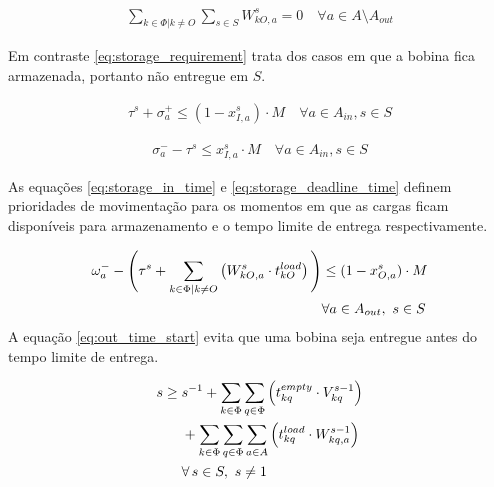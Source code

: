 \documentclass[journal]{IEEEtran}
\begin{document}
        \begin{align}
            \sum_{k \in \Phi | k \neq O} \sum_{s \in S} W^s_{kO,a} = 0 \quad \forall a \in A \setminus A_{out} 
            \label{eq:storage_requirement}
        \end{align}

        Em contraste \ref{eq:storage_requirement} trata dos casos em que a bobina fica armazenada, portanto não
        entregue em $S$.
        
        

        \begin{align}
        \tau^s + \sigma^+_a \leq (1 - x^s_{I,a}) \cdot M \quad \forall a \in A_{in}, s \in S 
            \label{eq:storage_in_time}
        \end{align}
        
        \begin{align}
             \sigma^-_a - \tau^s \leq x^s_{I,a} \cdot M \quad \forall a \in A_{in}, s \in S 
            \label{eq:storage_deadline_time}
        \end{align}
        
        As equações \ref{eq:storage_in_time} e \ref{eq:storage_deadline_time} definem
        prioridades de movimentação para os momentos em que as cargas ficam disponíveis
        para armazenamento e o tempo limite de entrega respectivamente.

        \begin{align}
            \omega_a^- - \Bigg( \tau^s + 
            \sum_{k \in \Phi \mid k \neq O} \left( W^s_{kO,a} \cdot t^{load}_{kO} \right) 
            \Bigg) 
            &\leq (1 - x^s_{O,a}) \cdot M \notag \\
            &\forall a \in A_{out},\ s \in S 
            \label{eq:out_time_start}
        \end{align}
        A equação \ref{eq:out_time_start} evita que uma bobina seja entregue antes
        do tempo limite de entrega.

        \begin{align}
            s \geq\; & s^{-1} 
            + \sum_{k \in \Phi} \sum_{q \in \Phi} \left( t^{empty}_{kq} \cdot V^{s-1}_{kq} \right) \notag \\
            & + \sum_{k \in \Phi} \sum_{q \in \Phi} \sum_{a \in A} \left( t^{load}_{kq} \cdot W^{s-1}_{kq,a} \right) \notag \\
            & \forall\, s \in S,\ s \neq 1 \label{eq:time_progression}
        \end{align}
\end{document}
